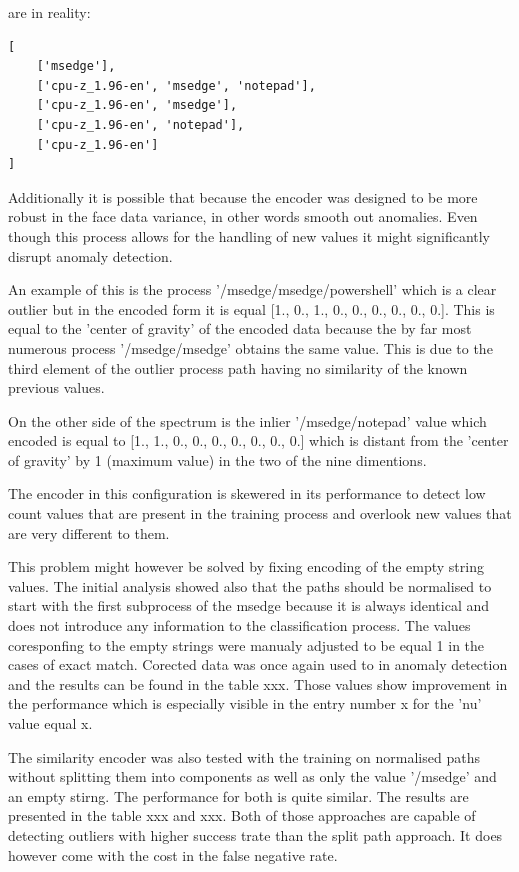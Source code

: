 \documentclass[a4paper,twoside,12pt]{book}
\begin{document}
are in reality:

\begin{lstlisting}
[
	['msedge'],
	['cpu-z_1.96-en', 'msedge', 'notepad'],
	['cpu-z_1.96-en', 'msedge'],
	['cpu-z_1.96-en', 'notepad'],
	['cpu-z_1.96-en']
]
\end{lstlisting}



Additionally it is possible that because the encoder was designed to be more robust in the face 
data variance, in other words smooth out anomalies. Even though this process allows for the handling
of new values it might significantly disrupt anomaly detection.

An example of this is the process '/msedge/msedge/powershell' which is a clear outlier
but in the encoded form it is equal [1., 0., 1., 0., 0., 0., 0., 0., 0.]. This is equal
to the 'center of gravity' of the encoded data because the by far most numerous process
'/msedge/msedge' obtains the same value. This is due to the third element of the outlier process  
path having no similarity of the known previous values.

On the other side of the spectrum is the inlier '/msedge/notepad' value which encoded is equal to
[1., 1., 0., 0., 0., 0., 0., 0., 0.] which is distant from the 'center of gravity' by 1 (maximum 
value) in the two of the nine dimentions. 

The encoder in this configuration is skewered in its performance to detect low count values that
are present in the training process and overlook new values that are very different to them. 

This problem might however be solved by fixing encoding of the empty string values. The
initial analysis showed also that the paths should be normalised to start with the first 
subprocess of the msedge because it is always identical and does not introduce any information
to the classification process. The values coresponfing to the empty strings were manualy adjusted
to be equal 1 in the cases of exact match. Corected data was once again used to in anomaly detection
and the results can be found in the table xxx. Those values show improvement in the performance
which is especially visible in the entry number x for the 'nu' value equal x.

The similarity encoder was also tested with the training on normalised paths without splitting 
them into components as well as only the value '/msedge' and an empty stirng. The performance for
both is quite similar. The results are presented in the table xxx and xxx. Both of those approaches
are capable of detecting outliers with higher success trate than the split path approach. It does
however come with the cost in the false negative rate.
\end{document}

